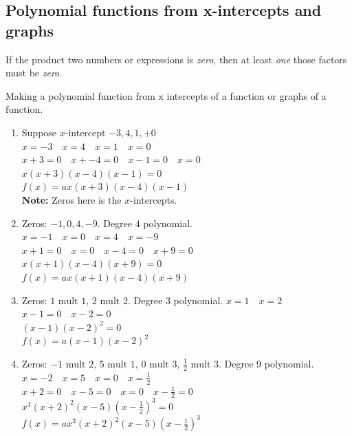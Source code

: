 \subsection{Polynomial functions from x-intercepts and graphs}
\begin{definition}
  If the product two numbers or expressions is \textit{zero}, then at least \textit{one} those factors must be \textit{zero}.
\end{definition}

\begin{definition}
  Making a polynomial function from x intercepts of a function or graphs of a function.
\end{definition}

\begin{example}
  \hfill
  \begin{enumerate}
  \item Suppose $x$-intercept $-3, 4, 1, + 0$ \\
    $x = -3 \quad x = 4 \quad x = 1 \quad x = 0$ \\
    $x + 3 = 0 \quad x + -4 = 0 \quad x - 1 = 0 \quad x = 0$ \\
    $x(x + 3)(x - 4)(x - 1) = 0$ \\
    $f(x) = ax(x + 3)(x - 4)(x - 1)$ \\
    \textbf{Note: }Zeros here is the $x$-intercepts.
  \item Zeros: $-1, 0, 4, -9$. Degree $4$ polynomial. \\
    $x = -1 \quad x = 0 \quad x = 4 \quad x = -9$ \\
    $x + 1 = 0 \quad x = 0 \quad x - 4 = 0 \quad x + 9 = 0$ \\
    $x(x + 1)(x - 4)(x + 9) = 0$ \\
    $f(x) = ax(x + 1)(x - 4)(x + 9)$
  \item Zeros: $1 \text{ mult } 1, \, 2 \text{ mult } 2$. Degree 3 polynomial.
    $x = 1 \quad x = 2$ \\
    $x - 1 = 0 \quad x - 2 = 0$ \\
    $(x - 1)(x - 2)^2 = 0$ \\
    $f(x) = a(x - 1)(x - 2)^2$
  \item Zeros: $-1 \text{ mult } 2, \, 5 \text{ mult } 1, \, 0 \text{ mult } 3, \, \frac{1}{2} \text{ mult } 3$. Degree 9 polynomial. \\
    $x = -2 \quad x = 5 \quad x = 0 \quad x = \frac{1}{2}$ \\
    $x + 2 = 0  \quad x - 5 = 0 \quad x = 0 \quad x - \frac{1}{2} = 0$ \\
    $x^3(x + 2)^2(x - 5)(x - \frac{1}{2})^3 = 0$ \\
    $f(x) = ax^3(x + 2)^2(x - 5)(x - \frac{1}{2})^3$ 
  \end{enumerate}
\end{example}

